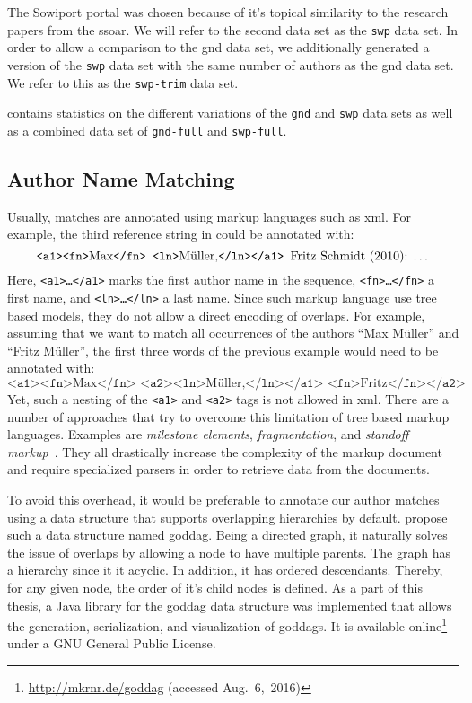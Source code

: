 The Sowiport portal was chosen because of it's topical similarity to the research papers from the \gls{ssoar}.
We will refer to the second data set as the \texttt{swp} data set.
In order to allow a comparison to the \gls{gnd} data set, we additionally generated a version of the \texttt{swp} data set with the same number of authors as the \gls{gnd} data set.
We refer to this as the \texttt{swp-trim} data set.

 contains statistics on the different variations of the \texttt{gnd} and \texttt{swp} data sets as well as a combined data set of \texttt{gnd-full} and \texttt{swp-full}.

\subsection{Author Name Matching}\label{subsec:i-author-name-matching}
Usually, matches are annotated using markup languages such as \gls{xml}.
For example, the third reference string in  could be annotated with:
\begin{equation*}
  \texttt{<a1><fn>}\text{Max}\texttt{</fn> <ln>}\text{M\"{u}ller,}\texttt{</ln></a1> }\text{Fritz Schmidt (2010): \dots}
\end{equation*}
Here, \texttt{<a1>\dots</a1>} marks the first author name in the sequence, \texttt{<fn>\dots</fn>} a first name, and \texttt{<ln>\dots</ln>} a last name.
Since such markup language use tree based models, they do not allow a direct encoding of overlaps.
For example, assuming that we want to match all occurrences of the authors ``Max M\"{u}ller'' and ``Fritz M\"{u}ller'', the first three words of the previous example would need to be annotated with:
\begin{equation*}
  \texttt{<a1><fn>}\text{Max}\texttt{</fn> <a2><ln>}\text{M\"{u}ller,}\texttt{</ln></a1> <fn>}\text{Fritz}\texttt{</fn></a2>}
\end{equation*}
Yet, such a nesting of the \texttt{<a1>} and \texttt{<a2>} tags is not allowed in \gls{xml}.
There are a number of approaches that try to overcome this limitation of tree based markup languages.
Examples are \textit{milestone elements}, \textit{fragmentation}, and \textit{standoff markup}~\citep{sperberg2000goddag}.
They all drastically increase the complexity of the markup document and require specialized parsers in order to retrieve data from the documents.

To avoid this overhead, it would be preferable to annotate our author matches using a data structure that supports overlapping hierarchies by default.
\citet{sperberg2000goddag} propose such a data structure named \acrfull{goddag}.
Being a directed graph, it naturally solves the issue of overlaps by allowing a node to have multiple parents.
The graph has a hierarchy since it it acyclic.
In addition, it has ordered descendants.
Thereby, for any given node, the order of it's child nodes is defined.
As a part of this thesis, a Java library for the \gls{goddag} data structure was implemented that allows the generation, serialization, and visualization of \glspl{goddag}.
It is available online\footnote{\url{http://mkrnr.de/goddag} (accessed Aug.~6,~2016)} under a GNU General Public License.

